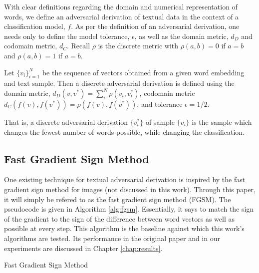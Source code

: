 \label{sec:adversarial_text_derivation}
\noindent
With clear definitions regarding the domain and numerical representation of words, we define an adversarial derivation of textual data in the context of a classification model, $f$.  As per the definition of an adversarial derivation, one needs only to define the model tolerance, $\epsilon$, as well as the domain metric, $d_D$ and codomain metric, $d_C$.  Recall $\rho$ is the discrete metric with $\rho(a,b) = 0$ if $a=b$ and $\rho(a,b)=1$ if $a=b$.

\begin{definition}
Let $\{v_i\}_{i=1}^N$ be the sequence of vectors obtained from a given word embedding and text sample.  Then a discrete adversarial derivation is defined using the domain metric, $d_D(v,v^*) = \sum_i^N\rho(v_i,v_i^*)$, codomain metric $d_C(f(v),f(v^*)) = \rho(f(v),f(v^*))$, and tolerance $\epsilon = 1/2$.
\end{definition}

\noindent
That is, a discrete adversarial derivation $\{v_i^*\}$ of sample $\{v_i\}$ is the sample which changes the fewest number of words possible, while changing the classification.  
\subsection{Fast Gradient Sign Method}
One existing technique for textual adversarial derivation is inspired by the fast gradient sign method for images (not discussed in this work).  Through this paper, it will simply be refered to as the fast gradient sign method (FGSM).  The pseudocode is given in Algorithm \ref{alg:fgsm}. \cite{np16}  Essentially, it says to match the sign of the gradient to the sign of the difference between word vectors as well as possible at every step.  This algorithm is the baseline against which this work's algorithms are tested.  Its performance in the original paper and in our experiments are discussed in Chapter \ref{chap:results}.

\begin{algorithm}
\begin{algorithmic}[1]
\begin{spacing}{1.0}
\caption{Fast Gradient Sign Method}
 
 
 
 
\EndWhile
\label{alg:fgsm}
\end{spacing}
\end{algorithmic}
\end{algorithm}


